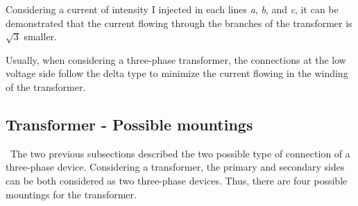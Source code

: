 \documentclass[12pt,a4paper]{report}
\begin{document}
Considering a current of intensity I injected in each lines \textit{a}, \textit{b}, and \textit{c}, it can be demonstrated that the current flowing through the branches of the transformer is $\sqrt{3}$ smaller.

Usually, when considering a three-phase transformer, the connections at the low voltage side follow the delta type to minimize the current flowing in the winding of the transformer.
\newpage
\subsection{Transformer - Possible mountings}
\quad\, The two previous subsections described the two possible type of connection of a three-phase device. Considering a transformer, the primary and secondary sides can be both considered as two three-phase devices. Thus, there are four possible mountings for the transformer.
\end{document}
